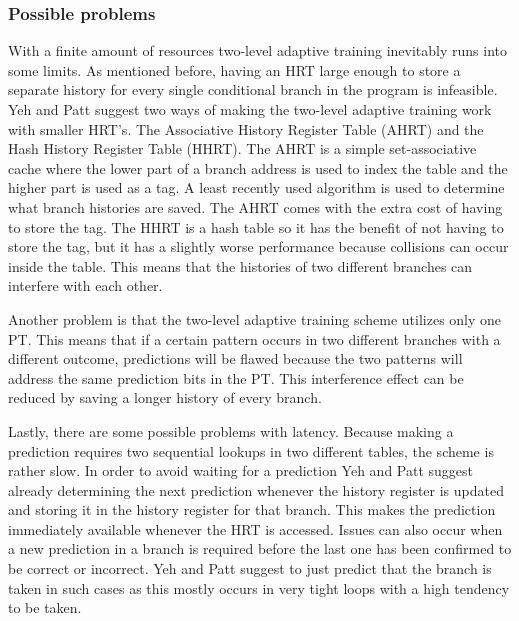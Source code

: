 \subsubsection{Possible problems}
\label{ssec:pp}
With a finite amount of resources two-level adaptive training inevitably runs into some limits.
As mentioned before, having an HRT large enough to store a separate history for every single conditional branch in the program is infeasible.
Yeh and Patt suggest two ways of making the two-level adaptive training work with smaller HRT's.
The Associative History Register Table (AHRT) and the Hash History Register Table (HHRT).
The AHRT is a simple set-associative cache where the lower part of a branch address is used to index the table and the higher part is used as a tag.
A least recently used algorithm is used to determine what branch histories are saved.
The AHRT comes with the extra cost of having to store the tag.
The HHRT is a hash table so it has the benefit of not having to store the tag, but it has a slightly worse performance because collisions can occur inside the table.
This means that the histories of two different branches can interfere with each other.

Another problem is that the two-level adaptive training scheme utilizes only one PT.
This means that if a certain pattern occurs in two different branches with a different outcome, predictions will be flawed because the two patterns will address the same prediction bits in the PT.
This interference effect can be reduced by saving a longer history of every branch.

Lastly, there are some possible problems with latency.
Because making a prediction requires two sequential lookups in two different tables, the scheme is rather slow.
In order to avoid waiting for a prediction Yeh and Patt suggest already determining the next prediction whenever the history register is updated and storing it in the history register for that branch.
This makes the prediction immediately available whenever the HRT is accessed.
Issues can also occur when a new prediction in a branch is required before the last one has been confirmed to be correct or incorrect.
Yeh and Patt suggest to just predict that the branch is taken in such cases as this mostly occurs in very tight loops with a high tendency to be taken.